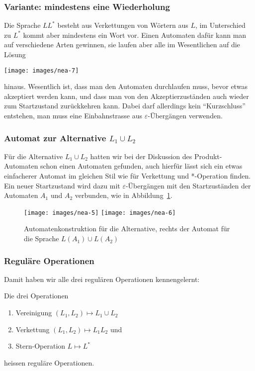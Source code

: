\subsubsection{Variante: mindestens eine Wiederholung}
Die Sprache $LL^*$ besteht aus Verkettungen von Wörtern aus $L$,
im Unterschied zu $L^*$ kommt aber mindestens ein Wort vor.
Einen Automaten dafür kann man auf verschiedene Arten gewinnen,
sie laufen aber alle im Wesentlichen auf die Lösung
\begin{center}
\texttt{[image: images/nea-7]}
\end{center}
hinaus.
Wesentlich ist, dass man den Automaten durchlaufen muss, bevor
etwas akzeptiert werden kann, und dass man von den Akzeptierzuständen
auch wieder zum Startzustand zurückkehren kann.
Dabei darf allerdings
kein ``Kurzschluss'' entstehen, man muss eine Einbahnstrasse aus
$\varepsilon$-Übergängen verwenden.

\subsubsection{Automat zur Alternative $L_1\cup L_2$}
Für die Alternative $L_1\cup L_2$ hatten wir bei der Diskussion
des Produkt-Automaten schon einen Automaten gefunden, auch
hierfür lässt sich ein etwas einfacherer Automat im gleichen
Stil wie für Verkettung und *-Operation finden.
Ein neuer Startzustand
wird dazu mit $\varepsilon$-Übergängen mit den Startzuständen
der Automaten $A_1$ und $A_2$ verbunden, wie in Abbildung~\ref{neaalternative}.
\begin{figure}
\begin{center}
\texttt{[image: images/nea-5]}
\qquad
\qquad
\texttt{[image: images/nea-6]}
\end{center}
\caption{Automatenkonstruktion für die Alternative, rechts der Automat
für die Sprache $L(A_1)\cup L(A_2)$\label{neaalternative}}
\end{figure}

\subsubsection{Reguläre Operationen}
Damit haben wir alle drei regulären Operationen kennengelernt:

\begin{definition}
Die drei Operationen
\begin{enumerate}
\item Vereinigung $(L_1,L_2)\mapsto L_1\cup L_2$
\item Verkettung $(L_1,L_2)\mapsto L_1L_2$ und
\item Stern-Operation $L\mapsto L^*$
\end{enumerate}
heissen reguläre Operationen.
\end{definition}

